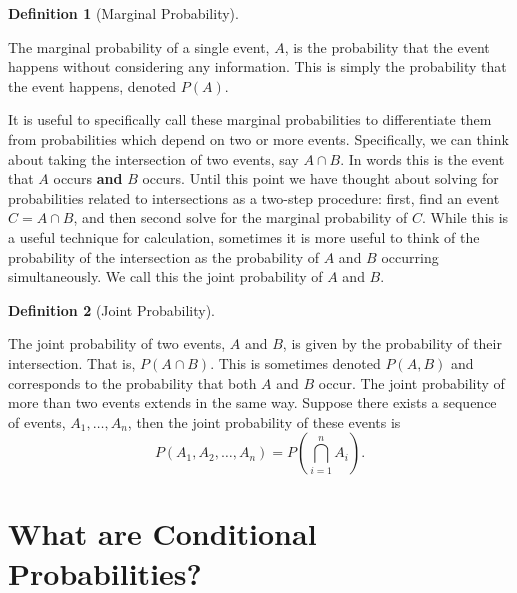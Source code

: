 \documentclass[
  letterpaper,
  DIV=11,
  numbers=noendperiod]{scrreprt}
\theoremstyle{definition}
\newtheorem{definition}{Definition}[chapter]
\theoremstyle{definition}
\theoremstyle{definition}
\theoremstyle{remark}
\begin{document}
\begin{definition}[Marginal
Probability]\protect\hypertarget{def-marginal-probability}{}\label{def-marginal-probability}

The marginal probability of a single event, \(A\), is the probability
that the event happens without considering any information. This is
simply the probability that the event happens, denoted \(P(A)\).

\end{definition}

It is useful to specifically call these marginal probabilities to
differentiate them from probabilities which depend on two or more
events. Specifically, we can think about taking the intersection of two
events, say \(A \cap B\). In words this is the event that \(A\) occurs
\textbf{and} \(B\) occurs. Until this point we have thought about
solving for probabilities related to intersections as a two-step
procedure: first, find an event \(C = A \cap B\), and then second solve
for the marginal probability of \(C\). While this is a useful technique
for calculation, sometimes it is more useful to think of the probability
of the intersection as the probability of \(A\) and \(B\) occurring
simultaneously. We call this the joint probability of \(A\) and \(B\).

\begin{definition}[Joint
Probability]\protect\hypertarget{def-joint-probability}{}\label{def-joint-probability}

The joint probability of two events, \(A\) and \(B\), is given by the
probability of their intersection. That is, \(P(A\cap B)\). This is
sometimes denoted \(P(A,B)\) and corresponds to the probability that
both \(A\) and \(B\) occur. The joint probability of more than two
events extends in the same way. Suppose there exists a sequence of
events, \(A_1, \dots, A_n\), then the joint probability of these events
is \[P(A_1,A_2,\dots,A_n) = P\left(\bigcap_{i=1}^n A_i\right).\]

\end{definition}

\section{What are Conditional
Probabilities?}\label{what-are-conditional-probabilities}
\end{document}
